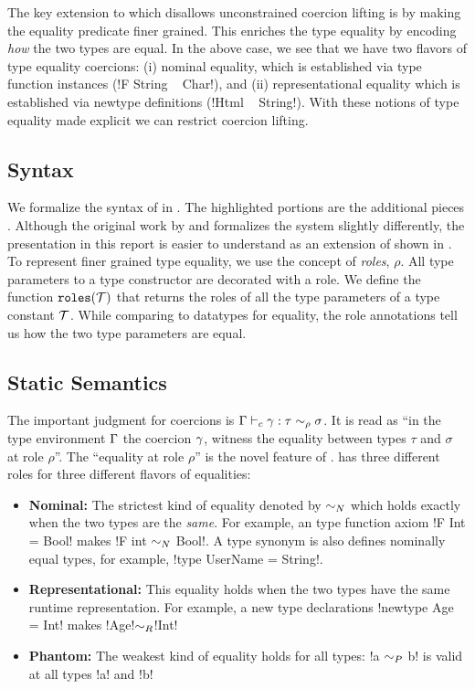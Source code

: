 \documentclass[screen,nonacm,manuscript,review]{acmart} %
\begin{document}
The key extension to \SFC which disallows unconstrained coercion lifting
is by making the equality predicate finer grained.
This enriches the type equality by encoding
\emph{how} the two types are equal. In the above case, we see that
we have two flavors of type equality coercions:
(i) nominal equality, which is established
via type function instances (!F String ~ Char!), and
(ii) representational equality which is established
via newtype definitions (!Html ~ String!).
With these notions of type equality made explicit we
can restrict coercion lifting.

\subsection{Syntax}\label{sec:sfr-syntax}
We formalize the syntax of \SFR in .
The highlighted portions are the additional pieces
. Although the original work
by \citet{breitner_safe_2014} and \citet{weirich_generative_2011}
formalizes the system slightly differently, the presentation in
this report is easier to understand as an extension of \SFC
shown in . To represent finer grained type equality,
we use the concept of \emph{roles}, $\rho$. All type parameters to a type constructor are
decorated with a role. We define the function
$\texttt{roles}(\mathcal{T})$ that returns the roles of
all the type parameters of a type constant $\mathcal{T}$.
While comparing to datatypes for equality, the role annotations
tell us how the two type parameters are equal.

\subsection{Static Semantics}\label{sec:sfr-static-sem}
The important judgment for coercions is
$\Gamma \vdash_{c} \gamma : \tau\sim_\rho\sigma$.
It is read as ``in the type environment $\Gamma$
the coercion $\gamma$, witness the equality between types $\tau$
and $\sigma$ at role $\rho$''.
The ``equality at role $\rho$'' is the novel feature of \SFR.
\SFR has three different roles for three different flavors of equalities:
\begin{itemize}
\item\textbf{Nominal:} The strictest kind of equality denoted by
  $\mathrel{\sim_N}$ which holds exactly when the two types are the \emph{same}.
  For example, an type function axiom !F Int = Bool!
  makes !F int $\mathrel{\sim_N}$ Bool!. A type synonym is also defines nominally
  equal types, for example, !type UserName = String!.
\item\textbf{Representational:} This equality holds when the two types
  have the same runtime representation.
  For example, a new type declarations !newtype Age = Int! makes
  !Age!$\mathrel{\sim_R}$!Int!
\item\textbf{Phantom:} The weakest kind of equality holds for all
  types: !a $\mathrel{\sim_P}$ b! is valid at all types !a! and !b!
\end{itemize}
\end{document}
